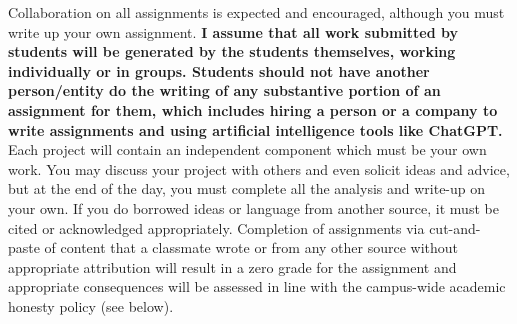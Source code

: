 \documentclass[10pt]{article}
\begin{document}

 Collaboration on all assignments is expected and encouraged, although you must write up your own assignment. {\bf I assume that all work submitted by students will be generated by the students themselves, working individually or in groups. Students should not have another person/entity do the writing of any substantive portion of an assignment for them, which includes hiring a person or a company to write assignments and using artificial intelligence tools like ChatGPT.} Each project will contain an independent component which must be your own work. You may discuss your project with others and even solicit ideas and advice, but at the end of the day, you must complete all the analysis and write-up on your own. If you do borrowed ideas or language from another source, it must be cited or acknowledged appropriately. Completion of assignments via cut-and-paste of content that a classmate wrote or from any other source without appropriate attribution will result in a zero grade for the assignment and appropriate consequences will be assessed in line with the campus-wide academic honesty policy (see below). \\


\end{document}
